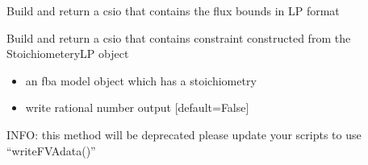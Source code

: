 \documentclass[letterpaper,10pt,english]{sphinxmanual}
\begin{document}
\begin{fulllineitems}
\label{\detokenize{modules_doc:cbmpy.CBWrite.BuildLPFluxBounds}}
\pysigstartsignatures
{}
\pysigstopsignatures
\sphinxAtStartPar
Build and return a csio that contains the flux bounds in LP format

\end{fulllineitems}


\begin{fulllineitems}
\label{\detokenize{modules_doc:cbmpy.CBWrite.BuildLPUserConstraints}}
\pysigstartsignatures
{}
\pysigstopsignatures
\sphinxAtStartPar
Build and return a csio that contains constraint constructed from
the StoichiometeryLP object
\begin{itemize}
\item {} 
\sphinxAtStartPar
{} an fba model object which has a stoichiometry

\item {} 
\sphinxAtStartPar
{} write rational number output {[}default=False{]}

\end{itemize}

\end{fulllineitems}


\begin{fulllineitems}
\label{\detokenize{modules_doc:cbmpy.CBWrite.WriteFVAdata}}
\pysigstartsignatures
{}
\pysigstopsignatures
\sphinxAtStartPar
INFO: this method will be deprecated please update your scripts to use “writeFVAdata()”

\end{fulllineitems}
\end{document}

